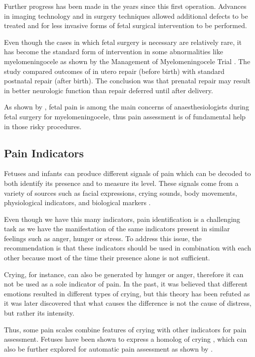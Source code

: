 Further progress has been made in the years since this first operation. Advances in imaging technology and in surgery techniques allowed additional defects to be treated and for less invasive forms of fetal surgical intervention to be performed.

Even though the cases in which fetal surgery is necessary are relatively rare, it has become the standard form of intervention in some abnormalities like myelomeningocele as shown by the Management of Myelomeningocele Trial \citep{Adzick2011}. The study compared outcomes of in utero repair (before birth) with standard postnatal repair (after birth). The conclusion was that prenatal repair may result in better neurologic function than repair deferred until after delivery.

As shown by \cite{Devoto2017}, fetal pain is among the main concerns of anaesthesiologists during fetal surgery for myelomeningocele, thus pain assessment is of fundamental help in those risky procedures. 

\subsection{Pain Indicators}

Fetuses and infants can produce different signals of pain which can be decoded to both identify its presence and to measure its level. These signals come from a variety of sources such as facial expressions, crying sounds, body movements, physiological indicators, and biological markers \citep{Bellieni2012}. 

Even though we have this many indicators, pain identification is a challenging task as we have the manifestation of the same indicators present in similar feelings such as anger, hunger or stress. To address this issue, the recommendation is that these indicators should be used in combination with each other \citep{Bellieni2012} because most of the time their presence alone is not sufficient. 

Crying, for instance, can also be generated by hunger or anger, therefore it can not be used as a sole indicator of pain. In the past, it was believed that different emotions resulted in different types of crying, but this theory has been refuted as it was later discovered that what causes the difference is not the cause of distress, but rather its intensity. 

Thus, some pain scales combine features of crying with other indicators for pain assessment. Fetuses have been shown to express a homolog of crying \citep{Gingras2005}, which can also be further explored for automatic pain assessment as shown by \cite{abs-1909-02543}. 

